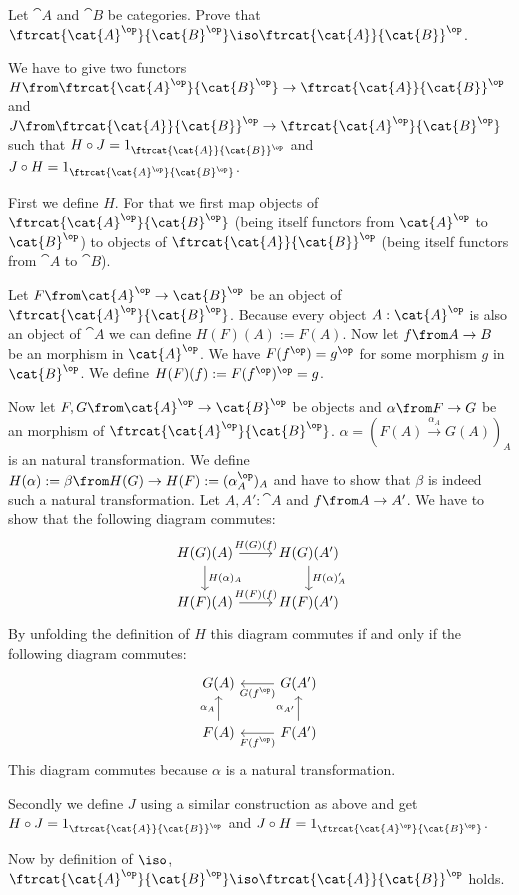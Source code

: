 \begin{exercise}
        Let $\cat{A}$ and $\cat{B}$ be categories. Prove that
        $\ftrcat{\cat{A}^\op}{\cat{B}^\op} \iso \ftrcat{\cat{A}}{\cat{B}}^\op$.
\end{exercise}

\begin{answer}
  We have to give two functors
  $H \from \ftrcat{\cat{A}^\op}{\cat{B}^\op} \to \ftrcat{\cat{A}}{\cat{B}}^\op$
  and
  $J \from \ftrcat{\cat{A}}{\cat{B}}^\op \to \ftrcat{\cat{A}^\op}{\cat{B}^\op}$
  such that $H \circ J = 1_{\ftrcat{\cat{A}}{\cat{B}}^\op}$ and $J \circ H = 1_{\ftrcat{\cat{A}^\op}{\cat{B}^\op}}$.

  First we define $H$. For that we first map objects of
  $\ftrcat{\cat{A}^\op}{\cat{B}^\op}$ (being itself functors from $\cat{A}^\op$ to $\cat{B}^\op$)
  to objects of $\ftrcat{\cat{A}}{\cat{B}}^\op$ (being itself functors from $\cat{A}$ to $\cat{B}$).

  Let $F\from \cat{A}^\op \to \cat{B}^\op$ be an object of $\ftrcat{\cat{A}^\op}{\cat{B}^\op}$.
  Because every object $A : \cat{A}^\op$ is also an object of $\cat{A}$ we can define
  $H(F)(A) := F(A)$.
  Now let $f \from A \to B$ be an morphism in $\cat{A}^\op$. We have $F(f^\op)=g^\op$ for some morphism $g$ in $\cat{B}^\op$.
  We define $H(F)(f) := F(f^\op)^\op = g$.

  Now let $F, G \from \cat{A}^\op \to \cat{B}^\op$ be objects and
  $\alpha \from F \to G$ be an morphism of $\ftrcat{\cat{A}^\op}{\cat{B}^\op}$.
  $\alpha = (F(A) \stackrel{\alpha_A}{\to} G(A))_A$ is an natural transformation.
  We define $H(\alpha) := \beta \from H(G) \to H(F) := (\alpha_A^\op)_A$ and have to show that $\beta$ is indeed such a natural transformation.
  Let $A, A' : \cat{A}$ and $f \from A \to A'$. We have to show that the following diagram commutes:
  \[
    \begin{tikzcd}
      H(G)(A) \arrow{r}{H(G)(f)} \arrow{d}{H(\alpha)_A} & H(G)(A') \arrow{d}{H(\alpha)_A'} \\
      H(F)(A) \arrow{r}{H(F)(f)} & H(F)(A')
    \end{tikzcd}
  \]
  By unfolding the definition of $H$ this diagram commutes if and only if the following diagram commutes:
  \[
    \begin{tikzcd}
      G(A) & G(A') \arrow{l}{G(f^\op)} \\
      F(A) \arrow{u}{\alpha_A} & F(A') \arrow{l}{F(f^\op)} \arrow{u}{\alpha_{A'}}
    \end{tikzcd}
  \]
  This diagram commutes because $\alpha$ is a natural transformation.

  Secondly we define $J$ using a similar construction as above and get
  $H \circ J = 1_{\ftrcat{\cat{A}}{\cat{B}}^\op}$ and $J \circ H = 1_{\ftrcat{\cat{A}^\op}{\cat{B}^\op}}$.

  Now by definition of $\iso$,
  $\ftrcat{\cat{A}^\op}{\cat{B}^\op} \iso \ftrcat{\cat{A}}{\cat{B}}^\op$
  holds.
\end{answer}

